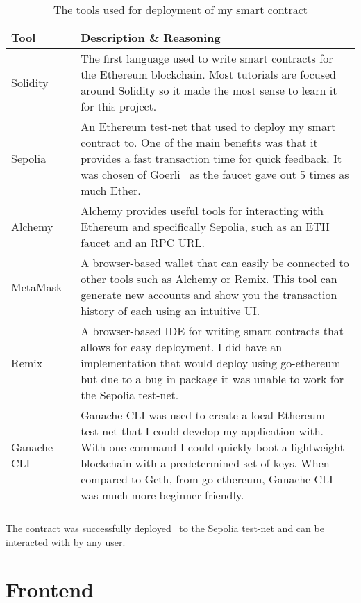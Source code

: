 \begin{longtable}{p{} p{}}
  \toprule
  \textbf{Tool} & \textbf{Description \& Reasoning}
  \\\midrule\midrule
  Solidity~\cite{noauthor_solidity_nodate}
  & \small The first language used to write smart contracts for the Ethereum blockchain. Most tutorials are focused around Solidity so it made the most sense to learn it for this project.\\
  Sepolia~\cite{noauthor_sepolia_nodate}
  & \small An Ethereum test-net that used to deploy my smart contract to. One of the main benefits was that it provides a fast transaction time for quick feedback. It was chosen of Goerli~\cite{noauthor_goerli_nodate} as the faucet gave out 5 times as much Ether.\\
  Alchemy~\cite{noauthor_alchemy_nodate}
  & \small Alchemy provides useful tools for interacting with Ethereum and specifically Sepolia, such as an ETH faucet and an RPC URL.\\
  MetaMask~\cite{noauthor_crypto_nodate}
  & \small A browser-based wallet that can easily be connected to other tools such as Alchemy or Remix. This tool can generate new accounts and show you the transaction history of each using an intuitive UI.\\
  Remix~\cite{noauthor_remix_nodate}
  & \small A browser-based IDE for writing smart contracts that allows for easy deployment. I did have an implementation that would deploy using go-ethereum but due to a bug in package it was unable to work for the Sepolia test-net.
  \\
  Ganache CLI~\cite{noauthor_trufflesuiteganache_2023}
  & Ganache CLI was used to create a local Ethereum test-net that I could develop my application with. With one command I could quickly boot a lightweight blockchain with a predetermined set of keys. When compared to Geth, from go-ethereum, Ganache CLI was much more beginner friendly. 
  \\\bottomrule\bottomrule
  \caption{The tools used for deployment of my smart contract}
  \label{tab:sc-tools}
\end{longtable}

\newparagraph
The contract was successfully deployed~\cite{etherscanio_deployed_nodate} to the Sepolia test-net and can be interacted with by any user.

\section{Frontend}

